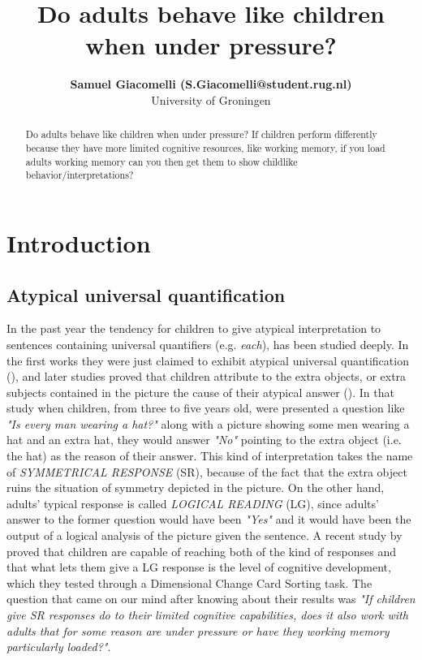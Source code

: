\documentclass[10pt, a4]{article}
\title{Do adults behave like children when under pressure?}
\author{{\large \bf Samuel Giacomelli (S.Giacomelli@student.rug.nl)} \\
University of Groningen}
\begin{document}
\maketitle

\begin{abstract}
    Do adults behave like children when under pressure? If children perform
    differently because they have more limited cognitive resources, like working
    memory, if you load adults working memory can you then get them to show childlike
    behavior/interpretations?   
\end{abstract}

\section{Introduction}
\subsection{Atypical universal quantification}
In the past year the tendency for children to give atypical interpretation to sentences containing universal quantifiers (e.g. \textit{each}),
has been studied deeply. In the first works they were just claimed to exhibit atypical universal quantification (\cite{piaget1964early}), and
later studies proved that children attribute to the extra objects, or extra subjects contained in the picture the cause of their atypical answer (\cite{philip1994event}).
In that study when children, from three to five years old, were presented a question like \textit{"Is every man wearing a hat?"} along with a picture showing
some men wearing a hat and an extra hat, they would answer \textit{"No"} pointing to the extra object (i.e. the hat) as the reason of their answer.
This kind of interpretation takes the name of \textit{SYMMETRICAL RESPONSE} (SR), because of the fact that the extra object ruins the situation
of symmetry depicted in the picture. On the other hand, adults' typical response is called \textit{LOGICAL READING} (LG), since adults' answer to the
former question would have been \textit{"Yes"} and it would have been the output of a logical analysis of the picture given the sentence.
A recent study by \cite{minai2012hinders} proved that children are capable of reaching both of the kind of responses and that what lets them give a
LG response is the level of cognitive development, which they tested through a Dimensional Change Card Sorting task.
The question that came on our mind after knowing about their results was \textit{"If children give SR responses do to their limited cognitive capabilities,
does it also work with adults that for some reason are under pressure or have they working memory particularly loaded?"}.
\end{document}
